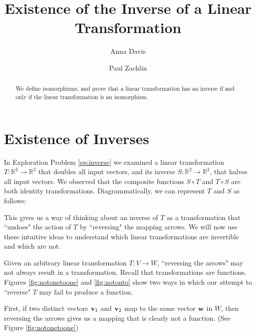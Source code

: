 \documentclass{ximera}
\author{Anna Davis \and Paul Zachlin} \title{Existence of the Inverse of a Linear Transformation} \license{CC-BY 4.0}
\renewcommand{\vec}[1]{{\bf #1}}
\newcommand{\RR}{\mathbb{R}}
\begin{document}
\begin{abstract}
  We define  isomorphisms, and prove that a linear transformation has an inverse if and only if the linear transformation is an isomorphism.
\end{abstract}
\maketitle



\section*{Existence of Inverses}

In Exploration Problem \ref{ep:inverse} we examined a linear transformation $T:\RR^2\rightarrow \RR^2$ that doubles all input vectors, and its inverse $S:\RR^2\rightarrow \RR^2$, that halves all input vectors.  We observed that the composite functions $S\circ T$ and $T\circ S$ are both identity transformations.  Diagrammatically, we can represent $T$ and $S$ as follows:
 \begin{center}
\end{center}

This gives us a way of thinking about an inverse of $T$ as a transformation that ``undoes" the action of $T$ by ``reversing" the mapping arrows.  We will now use these intuitive ideas to understand which linear transformations are invertible and which are not.

Given an arbitrary linear transformation $T:V\rightarrow W$, ``reversing the arrows"
 may not always result in a transformation. Recall that transformations are functions.  Figures \ref{fig:notonetoone} and \ref{fig:notonto} show two ways in which our attempt to ``reverse" $T$ may fail to produce a function.
 
First, if two distinct vectors $\vec{v}_1$ and $\vec{v}_2$ map to the same vector $\vec{w}$ in $W$, then reversing the arrows gives us a mapping that is clearly not a function. (See Figure \ref{fig:notonetoone}) %
\end{document}
